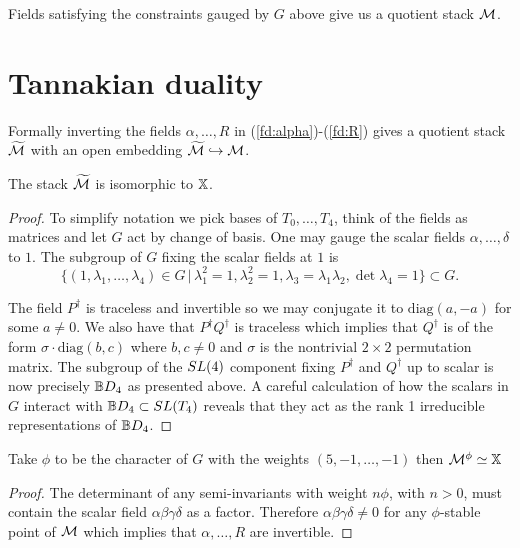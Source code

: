 \documentclass{amsart}
\theoremstyle{definition}
\begin{document}
Fields satisfying the constraints gauged by $G$ above give us a quotient stack $\mathcal{M}$.

\section{Tannakian duality}

Formally inverting the fields $\alpha, \ldots, R$ in (\ref{fd:alpha})-(\ref{fd:R}) gives a quotient stack $\widetilde{\mathcal{M}}$ with an open embedding $\widetilde{\mathcal{M}} \hookrightarrow \mathcal{M}$.

\begin{proposition}\label{prop:tannaka}
The stack $\widetilde{\mathcal{M}}$ is isomorphic to $\mathbb{X}$.
\end{proposition}

\begin{proof}
To simplify notation we pick bases of $T_0, \ldots, T_4$, think of the fields as matrices and let $G$ act by change of basis. 
One may gauge the scalar fields $\alpha, \ldots, \delta$ to $1$.
The subgroup of $G$ fixing the scalar fields at $1$ is $$\{(1,\lambda_1, \ldots, \lambda_4) \in G \,|\, \lambda_1^2=1, \lambda_2^2=1, \lambda_3 = \lambda_1\lambda_2, \det\lambda_4=1\} \subset G.$$

The field $P^\dagger$ is traceless and invertible so we may conjugate it to $\text{diag}(a, -a)$ for some $a \neq 0$.
We also have that $P^\dagger Q^\dagger$ is traceless which implies that $Q^\dagger$ is of the form $\sigma \cdot \text{diag}(b,c)$ where $b,c \neq 0$ and $\sigma$ is the nontrivial $2\times2$ permutation matrix.
The subgroup of the $SL(4)$ component fixing $P^\dagger$ and $Q^\dagger$ up to scalar is now precisely $\mathbb{B} D_4$ as presented above.
A careful calculation of how the scalars in $G$ interact with $\mathbb{B} D_4 \subset SL(T_4)$ reveals that they act as the rank 1 irreducible representations of $\mathbb{B} D_4$.
\end{proof}

\begin{corollary}
Take $\phi$ to be the character of $G$ with the weights $(5, -1,\ldots, -1)$ then $\mathcal{M}^\phi \simeq \mathbb{X}$
\end{corollary}

\begin{proof}
The determinant of any semi-invariants with weight $n \phi$, with $n>0$, must contain the scalar field $\alpha \beta \gamma \delta$ as a factor.
Therefore $\alpha \beta \gamma \delta \neq 0$ for any $\phi$-stable point of $\mathcal{M}$ which implies that $\alpha, \ldots, R$ are invertible.  
\end{proof}
\end{document}
